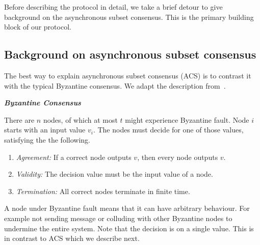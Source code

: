 Before describing the protocol in detail,
we take a brief detour to give background on the asynchronous subset consensus.
This is the primary building block of our protocol.

\subsection{Background on asynchronous subset consensus}
\label{sec:acs-background}

The best way to explain asynchronous subset consensus (ACS) is to contrast it with the typical Byzantine consensus.
We adapt the description from~\cite[Chapter 17]{podc}.
\begin{definition}
\textbf{\emph{Byzantine Consensus}}

There are $n$ nodes, of which at most $t$ might experience Byzantine fault.
Node $i$ starts with an input value $v_i$.
The nodes must decide for one of  those values, satisfying the the following.
\begin{enumerate}
    \item \emph{Agreement:}
        If a correct node outputs $v$, then every node outputs $v$.
    \item \emph{Validity:}
        The decision value must be the input value of a node.
    \item \emph{Termination:}
        All correct nodes terminate in finite time.
\end{enumerate}
\end{definition}
A node under Byzantine fault means that it can have arbitrary behaviour.
For example not sending message or colluding with other Byzantine nodes to undermine the entire system.
Note that the decision is on a single value.
This is in contrast to ACS which we describe next.

